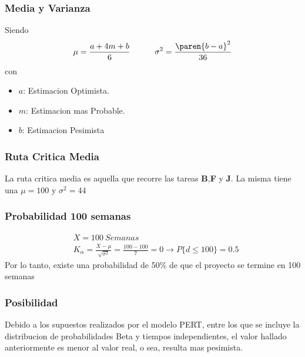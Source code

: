 \begin{homeworkProblem}
\subsubsection{Media y Varianza}
Siendo
\begin{align*}
    \mu=\frac{a+4m+b}{6} \quad\quad\quad \sigma^2=\frac{\paren{b-a}^2}{36}  
\end{align*}
con 
\begin{itemize}
    \item $a$: Estimacion Optimista.
    \item $m$: Estimacion mas Probable. 
    \item $b$: Estimacion Pesimista
\end{itemize}
\subsubsection{Ruta Critica Media}
La ruta critica media es aquella que recorre las tareas \textbf{B},\textbf{F} y \textbf{J}. La misma tiene una $\mu=100$ y $\sigma^2=44$
\subsubsection{Probabilidad 100 semanas}
\begin{align*}
    &X = 100\ Semanas  \\
   &K_{\alpha} = \frac{X-\mu}{\sqrt{\sigma^2}}=\frac{100-100}{7}=0\rightarrow P\{d\leq100\}=0.5 
\end{align*}
Por lo tanto, existe una probabilidad de 50\% de que el proyecto se termine en 100 semanas
\subsubsection{Posibilidad}
Debido a los supuestos realizados por el modelo PERT, entre los que se incluye la distribucion de probabilidades Beta y tiempos independientes, el valor hallado anteriormente es menor al valor real, o sea, resulta mas pesimista.
\end{homeworkProblem}